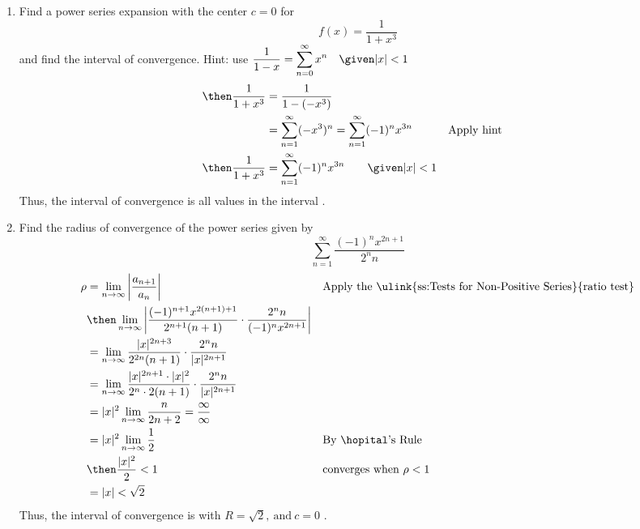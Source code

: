 \begin{enumerate}
\newpage %

  \item Find a power series expansion with the center \(c = 0 \) for
     \[%
     f(x) = \frac{1}{1+x^3}
     \]%
     and find the interval of convergence. Hint: use \(\displaystyle \frac{1}{1-x} = \sum_{n=0}^{\infty} x^n \quad \given |x| < 1 \)
     \begin{align*}
       \then \frac{1}{1+x^3} &= \frac{1}{1 - (-x^3)} \\
       &= \sum_{n=1}^{\infty} (-x^3)^n = \sum_{n=1}^{\infty} (-1)^nx^{3n}
       && \text{Apply hint} \\
       \then \frac{1}{1+x^3} &= \sum_{n=1}^{\infty} (-1)^n x^{3n} \qquad \given |x| < 1
     \end{align*}
     Thus, the interval of convergence is all values in the interval
     .

  \vspace{4em}

  \item Find the radius of convergence of the power series given by
    \[%
    \sum_{n=1}^{\infty} \frac{(-1)^n x^{2n+1} }{2^n n}
    \]%
    \begin{align*}
      \rho &= \lim_{n \to \infty} \left| \frac{a_{n+1}}{a_n}  \right|
           && \text{Apply the \ulink{ss:Tests for Non-Positive Series}{ratio test}} \\
           &\then \lim_{n \to \infty}
           \left| \frac{(-1)^{n+1} x^{2(n+1)+1}}{2^{n+1}(n+1)}
           \cdot \frac{2^n n}{(-1)^n x^{2n+1} }
           \right| \\
           &= \lim_{n \to \infty} \frac{|x|^{2n+3}}{2^{2n}(n+1)}
           \cdot \frac{2^n n}{|x|^{2n+1} } \\
           &= \lim_{n \to \infty} \frac{|x|^{2n+1} \cdot |x|^2}{2^n \cdot 2(n+1)}
           \cdot \frac{2^n n}{|x|^{2n+1} } \\
           &= |x|^2 \lim_{n \to \infty} \frac{n}{2n+2} = \frac{\infty}{\infty}\\
           &= |x|^2 \lim_{n \to \infty} \frac{1}{2}
           && \text{By \hopital's Rule} \\
           &\then \frac{|x|^2}{2} < 1
           && \text{converges when}~\rho < 1 \\
           &= |x| < \sqrt{2}
    \end{align*}
    Thus, the interval of convergence is  with \(R = \sqrt{2}, ~\text{and}~c = 0\)
    .

\end{enumerate}

